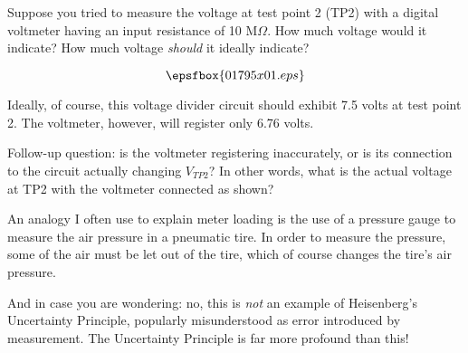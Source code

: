

Suppose you tried to measure the voltage at test point 2 (TP2) with a digital voltmeter having an input resistance of 10 M$\Omega$.  How much voltage would it indicate?  How much voltage {\it should} it ideally indicate?

$$\epsfbox{01795x01.eps}$$







Ideally, of course, this voltage divider circuit should exhibit 7.5 volts at test point 2.  The voltmeter, however, will register only 6.76 volts.

\vskip 10pt

Follow-up question: is the voltmeter registering inaccurately, or is its connection to the circuit actually changing $V_{TP2}$?  In other words, what is the actual voltage at TP2 with the voltmeter connected as shown?







An analogy I often use to explain meter loading is the use of a pressure gauge to measure the air pressure in a pneumatic tire.  In order to measure the pressure, some of the air must be let out of the tire, which of course changes the tire's air pressure.

And in case you are wondering: no, this is {\it not} an example of Heisenberg's Uncertainty Principle, popularly misunderstood as error introduced by measurement.  The Uncertainty Principle is far more profound than this!




